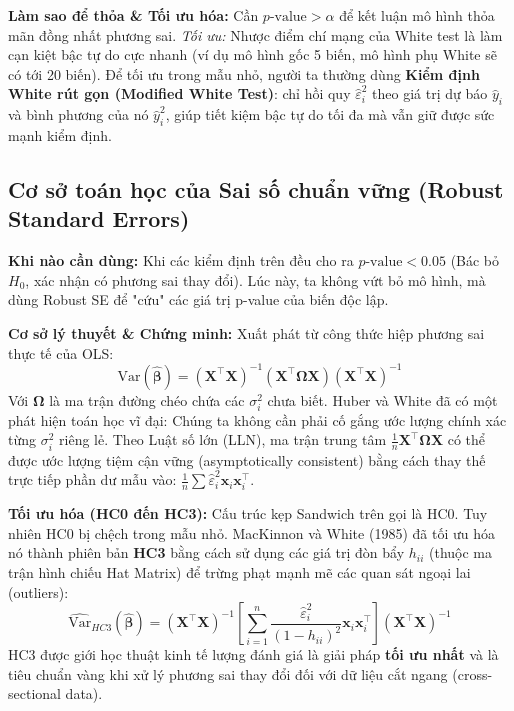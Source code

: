 \documentclass[12pt, a4paper]{article}
\begin{document}
	\textbf{Làm sao để thỏa \& Tối ưu hóa:} Cần $p\text{-value} > \alpha$ để kết luận mô hình thỏa mãn đồng nhất phương sai. \textit{Tối ưu:} Nhược điểm chí mạng của White test là làm cạn kiệt bậc tự do cực nhanh (ví dụ mô hình gốc 5 biến, mô hình phụ White sẽ có tới 20 biến). Để tối ưu trong mẫu nhỏ, người ta thường dùng \textbf{Kiểm định White rút gọn (Modified White Test)}: chỉ hồi quy $\hat{\varepsilon}_i^2$ theo giá trị dự báo $\hat{y}_i$ và bình phương của nó $\hat{y}_i^2$, giúp tiết kiệm bậc tự do tối đa mà vẫn giữ được sức mạnh kiểm định.
	
	\subsection{Cơ sở toán học của Sai số chuẩn vững (Robust Standard Errors)}
	\textbf{Khi nào cần dùng:} Khi các kiểm định trên đều cho ra $p\text{-value} < 0.05$ (Bác bỏ $H_0$, xác nhận có phương sai thay đổi). Lúc này, ta không vứt bỏ mô hình, mà dùng Robust SE để "cứu" các giá trị p-value của biến độc lập.
	
	\textbf{Cơ sở lý thuyết \& Chứng minh:} Xuất phát từ công thức hiệp phương sai thực tế của OLS:
	\begin{equation}
		\text{Var}(\hat{\boldsymbol{\beta}}) = (\mathbf{X}^{\top}\mathbf{X})^{-1} (\mathbf{X}^{\top} \boldsymbol{\Omega} \mathbf{X}) (\mathbf{X}^{\top}\mathbf{X})^{-1}
	\end{equation}
	Với $\boldsymbol{\Omega}$ là ma trận đường chéo chứa các $\sigma_i^2$ chưa biết. Huber \cite{huber1967} và White \cite{white1980} đã có một phát hiện toán học vĩ đại: Chúng ta không cần phải cố gắng ước lượng chính xác từng $\sigma_i^2$ riêng lẻ. Theo Luật số lớn (LLN), ma trận trung tâm $\frac{1}{n} \mathbf{X}^{\top} \boldsymbol{\Omega} \mathbf{X}$ có thể được ước lượng tiệm cận vững (asymptotically consistent) bằng cách thay thế trực tiếp phần dư mẫu vào: $\frac{1}{n} \sum \hat{\varepsilon}_i^2 \mathbf{x}_i \mathbf{x}_i^{\top}$.
	
	\textbf{Tối ưu hóa (HC0 đến HC3):}
	Cấu trúc kẹp Sandwich trên gọi là HC0. Tuy nhiên HC0 bị chệch trong mẫu nhỏ. MacKinnon và White (1985) \cite{mackinnon1985} đã tối ưu hóa nó thành phiên bản \textbf{HC3} bằng cách sử dụng các giá trị đòn bẩy $h_{ii}$ (thuộc ma trận hình chiếu Hat Matrix) để trừng phạt mạnh mẽ các quan sát ngoại lai (outliers):
	\begin{equation}
		\widehat{\text{Var}}_{HC3}(\hat{\boldsymbol{\beta}}) = (\mathbf{X}^{\top}\mathbf{X})^{-1} \left[\sum_{i=1}^{n} \frac{\hat{\varepsilon}_i^2}{(1-h_{ii})^2} \mathbf{x}_i\mathbf{x}_i^{\top}\right] (\mathbf{X}^{\top}\mathbf{X})^{-1}
	\end{equation}
	HC3 được giới học thuật kinh tế lượng đánh giá là giải pháp \textbf{tối ưu nhất} và là tiêu chuẩn vàng khi xử lý phương sai thay đổi đối với dữ liệu cắt ngang (cross-sectional data).
	
\end{document}
